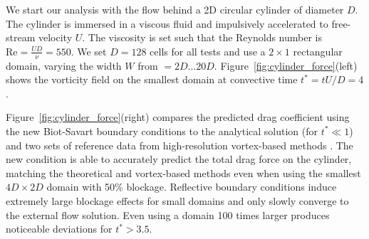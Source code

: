 \documentclass[final,1p,times]{elsarticle}
\begin{document}
We start our analysis with the flow behind a 2D circular cylinder of diameter $D$. The cylinder is immersed in a viscous fluid and impulsively accelerated to free-stream velocity $U$. The viscosity is set such that the Reynolds number is $\text{Re}=\frac{UD}{\nu}=550$. We set $D=128$ cells for all tests and use a $2\times 1$ rectangular domain, varying the width $W$ from $=2D\ldots 20D$. Figure~\ref{fig:cylinder_force}(left) shows the vorticity field on the smallest domain at convective time $t^*=tU/D=4$.

Figure~\ref{fig:cylinder_force}(right) compares the predicted drag coefficient using the new Biot-Savart boundary conditions to the analytical solution \cite{Collins1973TheCylinder} (for $t^*\ll 1$) and two sets of reference data from high-resolution vortex-based methods \cite{KoumoutsakostAN1995High-resolutionMethods, Gillis2019AMethod}. The new condition is able to accurately predict the total drag force on the cylinder, matching the theoretical and vortex-based methods even when using the smallest $4D\times2D$ domain with 50\% blockage. 
Reflective boundary conditions induce extremely large blockage effects for small domains and only slowly converge to the external flow solution. Even using a domain 100 times larger produces noticeable deviations for $t^*>3.5$. %

\end{document}
